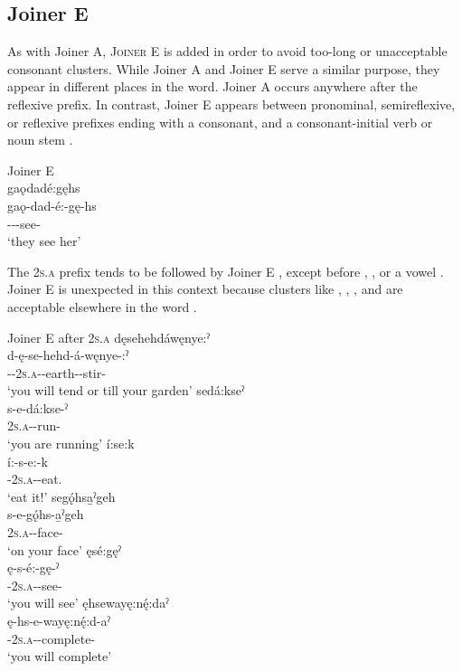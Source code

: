 \subsection{Joiner E } \label{Joiner E}
As with Joiner A, \textsc{Joiner E}  is added in order to avoid too-long or unacceptable consonant clusters. While Joiner A and Joiner E serve a similar purpose, they appear in different places in the word. Joiner A occurs anywhere after the reflexive prefix. In contrast, Joiner E appears between pronominal, semireflexive, or reflexive prefixes ending with a consonant, and a consonant-initial verb or noun stem . 

\ea\label{ex:epenvex7} Joiner E\\
gaǫdadé:gęhs\\
\gll gaǫ-dad-é:-gę-hs\\
 -{}-{\joinerE}-see-{\habitual}\\
\glt `they see her'
\z


The  \textsc{2s.a} prefix tends to be followed by Joiner E , except before , , or a vowel . Joiner E is unexpected in this context because clusters like , , , and  are acceptable elsewhere in the word .

\ea\label{ex:epenvex8} Joiner E after  \textsc{2s.a}
\ea dęsehehdáwęnye:ˀ\\
\gll d-ę-se-hehd-á-węnye-:ˀ\\
 {\dualic}-{\future}-\textsc{2s.a}-{\joinerE}-earth-{\joinerA}-stir-{\punctual}\\
\glt `you will tend or till your garden'
\ex sedá:kseˀ\\
\gll s-e-dá:kse-ˀ\\
 \textsc{2s.a}-{\joinerE}-run-{\stative}\\
\glt `you are running'
\ex í:se:k\\
\gll í:-s-e:-k\\
 {\prothetic}-\textsc{2s.a}-{\joinerE}-eat.{\zeropunctual}\\
\glt `eat it!'
\ex segǫ́hsa̱ˀgeh\\
\gll s-e-gǫ́hs-a̱ˀgeh\\
 \textsc{2s.a}-{\joinerE}-face-{\on}\\
\glt `on your face'
\ex ęsé:gęˀ\\
\gll ę-s-é:-gę-ˀ\\
 \fut-\textsc{2s.a}-{\joinerE}-see-{\punctual}\\
\glt `you will see'
\ex ęhsewayę:nę́:daˀ\\
\gll ę-hs-e-wayę:nę́:d-aˀ\\
 \fut-\textsc{2s.a}-{\joinerE}-complete-{\punctual}\\
\glt `you will complete'
\z
\z


